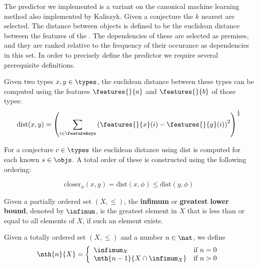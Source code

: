 The \knn predictor we implemented is a variant on the canonical machine learning method also implemented by Kaliszyk. \cite{kaliszyk2013stronger}
Given a conjecture the $k$ nearest \coqobjs are selected.
The distance between objects is defined to be the euclidean distance between the features of the \coqobjs.
The dependencies of these \coqobjs are selected as premises, and they are ranked relative to the frequency of their occurance as dependencies in this set.
In order to precisely define the \knn predictor we require several prerequisite definitions.

\begin{definition}\label{def:dist}
  Given two types $x, y \in \types$, the euclidean distance between these types can be computed using the features $\features{}{a}$ and $\features{}{b}$ of those types:
  $$ \text{dist}(x, y) = \left( \sum_{i \in \featurekeys} \left( \features{}{x}(i) - \features{}{y}(i) \right)^2 \right)^{\frac{1}{2}} $$
\end{definition}

For a conjecture $c \in \types$ the euclidean distance using $\text{dist}$ is computed for each known \coqobj $s \in \objs$.
A total order of these \coqobjs is constructed using the following ordering:

\begin{definition}
  $$
    \text{closer}_\phi(x, y) = \text{dist}(x, \phi) \leq \text{dist}(y, \phi)
  $$
\end{definition}

\begin{definition}\label{def:infimum}
  Given a partially ordered set $(X, \leq)$,
  the \textbf{infimum} or \textbf{greatest lower bound}, denoted by $\infimum$, is the greatest element in $X$ that is less than or equal to all elements of $X$,
  if such an element exists.
\end{definition}

\begin{definition}\label{def:nth}
  Given a totally ordered set $(X, \leq)$ and a number $n \in \nat$, we define
  $$
    \nth{n}{X} = \left\{
      \begin{array}{ll}
        \infimum_X & \text{if}~n = 0 \\
        \nth{n-1}{X \cap \infimum_X} & \text{if}~n > 0 \\
      \end{array}
    \right.
  $$
\end{definition}

